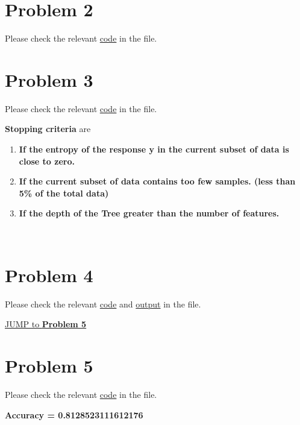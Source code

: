 \documentclass{article}
\begin{document}
\section*{Problem 2}
    \begin{center}
        Please check the relevant \href{https://github.com/z-zijie/2020Fall/blob/master/COMP760/Homework4/code.py}{code} in the file.
    \end{center}


\section*{Problem 3}
    \begin{center}
        Please check the relevant \href{https://github.com/z-zijie/2020Fall/blob/master/COMP760/Homework4/code.py}{code} in the file.
    \end{center}
    \textbf{Stopping criteria} are
    \begin{enumerate}
        \item \textbf{If the entropy of the response y in the current subset of data is close to zero.}
        \item \textbf{If the current subset of data contains too few samples. (less than 5\% of the total data)}
        \item \textbf{If the depth of the Tree greater than the number of features.}
    \end{enumerate}\

\section*{Problem 4}
    \begin{center}
        Please check the relevant \href{https://github.com/z-zijie/2020Fall/blob/master/COMP760/Homework4/code.py}{code} and \href{https://github.com/z-zijie/2020Fall/blob/master/COMP760/Homework4/P4.txt}{output} in the file.
    \end{center}
    \hyperref[sec:P5]{JUMP to \textbf{Problem 5}}
    

\section*{Problem 5}
\label{sec:P5}
    \begin{center}
        Please check the relevant \href{https://github.com/z-zijie/2020Fall/blob/master/COMP760/Homework4/code.py}{code} in the file.
    \end{center}
    \begin{center}
        \textbf{Accuracy = 0.8128523111612176}
    \end{center}
    
\end{document}
